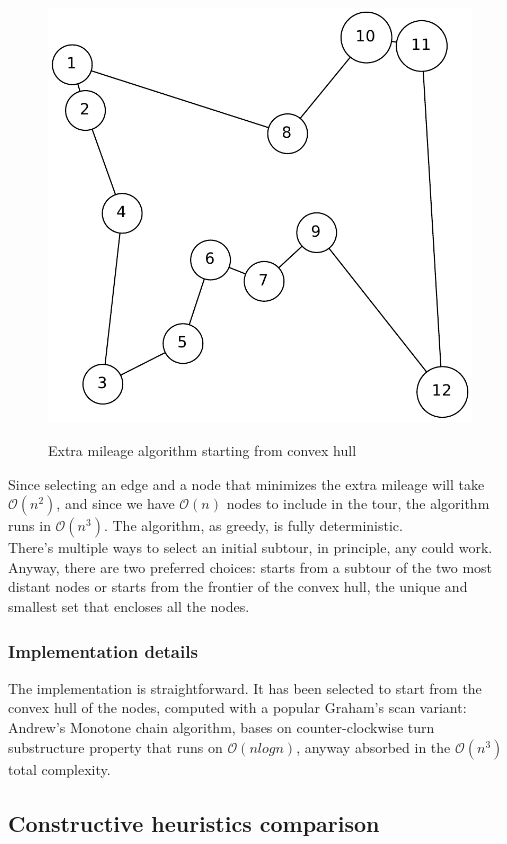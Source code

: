 \begin{figure}[h]
\begin{minipage}{.33\textwidth}
        \includegraphics[width=0.8\linewidth]{figures/heurc}
        \label{fig:sub2}
    \end{minipage}
    \caption{\centering Extra mileage algorithm starting from convex hull}
\end{figure}

Since selecting an edge and a node that minimizes the extra mileage will take
$\mathcal{O}(n^2)$, and since we have $\mathcal{O}(n)$ nodes to include in the
tour, the algorithm runs in $\mathcal{O}(n^3)$. The algorithm, as greedy, is
fully deterministic.\\
There's multiple ways to select an initial subtour, in principle, any could work.
Anyway, there are two preferred choices: starts from a subtour of the two most
distant nodes or starts from the frontier of the convex hull, the unique and
smallest set that encloses all the nodes.

\subsubsection{Implementation details}
The implementation is straightforward. It has been selected to start from the
convex hull of the nodes, computed with a popular Graham's scan variant:
Andrew's Monotone chain algorithm, bases on counter-clockwise turn substructure
property that runs on $\mathcal{O}(nlogn)$, anyway absorbed in the
$\mathcal{O}(n^3)$ total complexity.

\subsection{Constructive heuristics comparison}

